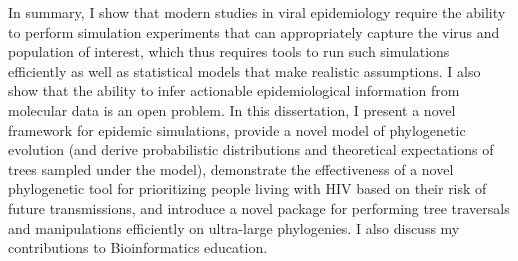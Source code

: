 In summary, I show that modern studies in viral epidemiology require the ability to perform simulation experiments that can appropriately capture the virus and population of interest, which thus requires tools to run such simulations efficiently as well as statistical models that make realistic assumptions. I also show that the ability to infer actionable epidemiological information from molecular data is an open problem. In this dissertation, I present a novel framework for epidemic simulations, provide a novel model of phylogenetic evolution (and derive probabilistic distributions and theoretical expectations of trees sampled under the model), demonstrate the effectiveness of a novel phylogenetic tool for prioritizing people living with \gls{HIV} based on their risk of future transmissions, and introduce a novel package for performing tree traversals and manipulations efficiently on ultra-large phylogenies. I also discuss my contributions to Bioinformatics education.

